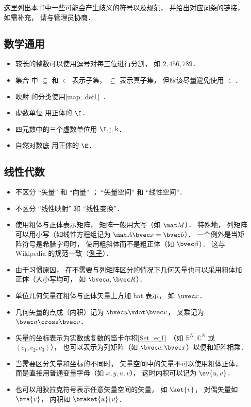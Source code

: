 
这里列出本书中一些可能会产生歧义的符号以及规范， 并给出对应词条的链接， 如需补充， 请与管理员协商．

\subsection{数学通用}
\begin{itemize}
\item 较长的整数可以使用逗号对每三位进行分割， 如 $2,456,789$．
\item 集合 中 $\subseteq$ 和 $\subset$ 表示子集， $\subsetneq$ 表示真子集， 但应该尽量避免使用 $\subset$．
\item 映射 的分类使用\autoref{map_def1}~．
\item 虚数单位 用正体的 $\I$．
\item 四元数中的三个虚数单位用 $\I, \mathrm{j}, \mathrm{k}$．
\item 自然对数底 用正体的 $\E$．
\end{itemize}

\subsection{线性代数}
\begin{itemize}
\item 不区分 “矢量” 和 “向量” ； “矢量空间” 和 “线性空间”．
\item 不区分 “线性映射” 和 “线性变换”．
\item 使用粗体与正体表示矩阵， 矩阵一般用大写（如 $\mat M$）． 特殊地， 列矩阵可以用小写（如线性方程组记为 $\mat A \bvec x = \bvec b$）． 一个例外是当矩阵符号是希腊字母时， 使用粗斜体而不是粗正体（如 $\bvec \beta$）． 这与 Wikipedia 的规范一致（\href{https://en.wikipedia.org/wiki/Angular_acceleration}{例子}）．
\item 由于习惯原因， 在不需要与列矩阵区分的情况下几何矢量也可以采用粗体加正体（大小写均可， 如 $\bvec a, \bvec R$）．
\item 单位几何矢量在粗体与正体矢量上方加 hat 表示， 如 $\uvec x$．
\item 几何矢量的点成（内积）记为 $\bvec u \vdot \bvec v$， 叉乘记为 $\bvec u \cross \bvec v$．
\item 矢量的坐标表示为实数或复数的笛卡尔积\autoref{Set_eq1}~（如 $\mathbb R^N, \mathbb C^N$ 或 $(c_1, c_2, c_3)$）， 也可以表示为列矩阵（如 $\bvec c, \bvec x$）以便和矩阵相乘．
\item 当需要区分矢量和坐标的不同时， 矢量空间中的矢量不可以使用粗体正体， 而是直接用普通变量字母（如 $x, y, u, v$）， 这时内积可以记为 $\ev{u, v}$．
\item 也可以用狄拉克符号表示任意矢量空间的矢量， 如 $\ket{v}$， 对偶矢量如 $\bra{v}$， 内积如 $\braket{u}{v}$．
\end{itemize}

